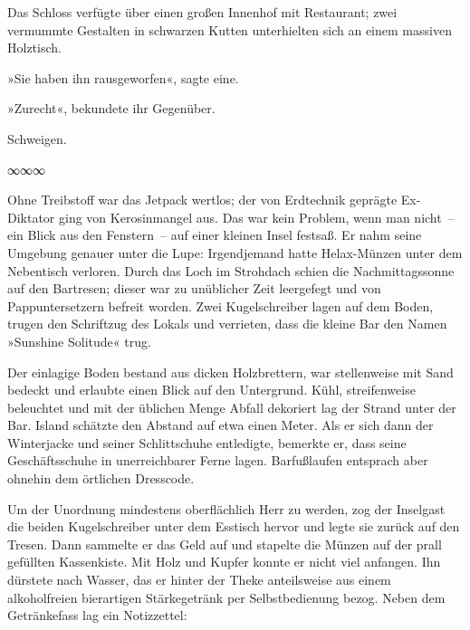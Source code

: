 Das Schloss verfügte über einen großen Innenhof mit Restaurant; zwei vermummte Gestalten in schwarzen Kutten unterhielten sich an einem massiven Holztisch.

»Sie haben ihn rausgeworfen«, sagte eine.

»Zurecht«, bekundete ihr Gegenüber.

Schweigen.

\begin{center}
∞∞∞
\end{center}

Ohne Treibstoff war das Jetpack wertlos; der von Erdtechnik geprägte Ex-Diktator ging von Kerosinmangel aus. Das war kein Problem, wenn man nicht~– ein Blick aus den Fenstern~– auf einer kleinen Insel festsaß. Er nahm seine Umgebung genauer unter die Lupe: Irgendjemand hatte Helax-Münzen unter dem Nebentisch verloren. Durch das Loch im Strohdach schien die Nachmittagssonne auf den Bartresen; dieser war zu unüblicher Zeit leergefegt und von Pappuntersetzern befreit worden. Zwei Kugelschreiber lagen auf dem Boden, trugen den Schriftzug des Lokals und verrieten, dass die kleine Bar den Namen »Sunshine Solitude« trug.

Der einlagige Boden bestand aus dicken Holzbrettern, war stellenweise mit Sand bedeckt und erlaubte einen Blick auf den Untergrund. Kühl, streifenweise beleuchtet und mit der üblichen Menge Abfall dekoriert lag der Strand unter der Bar. Island schätzte den Abstand auf etwa einen Meter. Als er sich dann der Winterjacke und seiner Schlittschuhe entledigte, bemerkte er, dass seine Geschäftsschuhe in unerreichbarer Ferne lagen. Barfußlaufen entsprach aber ohnehin dem örtlichen Dresscode.

Um der Unordnung mindestens oberflächlich Herr zu werden, zog der Inselgast die beiden Kugelschreiber unter dem Esstisch hervor und legte sie zurück auf den Tresen. Dann sammelte er das Geld auf und stapelte die Münzen auf der prall gefüllten Kassenkiste. Mit Holz und Kupfer konnte er nicht viel anfangen. Ihn dürstete nach Wasser, das er hinter der Theke anteilsweise aus einem alkoholfreien bierartigen Stärkegetränk per Selbstbedienung bezog. Neben dem Getränkefass lag ein Notizzettel:

